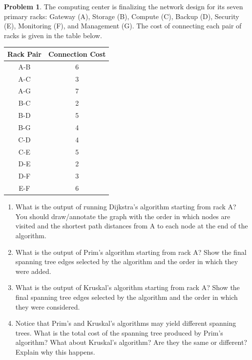 \documentclass[10pt]{article}
\theoremstyle{definition}
\newtheorem{problem}{Problem}
\begin{document}
\begin{problem}
    The computing center is finalizing the network design for its seven primary racks: Gateway (A), Storage (B), Compute (C), Backup (D), Security (E), Monitoring (F), and Management (G). The cost of connecting each pair of racks is given in the table below.
    \begin{center}
        \begin{tabular}{c|c}
            \textbf{Rack Pair} & \textbf{Connection Cost} \\
            \hline
            A-B & 6 \\
            A-C & 3 \\
            A-G & 7 \\
            B-C & 2 \\
            B-D & 5 \\
            B-G & 4 \\
            C-D & 4 \\
            C-E & 5 \\
            D-E & 2 \\
            D-F & 3 \\
            E-F & 6             
        \end{tabular}
    \end{center}

    \begin{enumerate}[label=(\alph*)]
        \item What is the output of running Dijkstra's algorithm starting from rack A? You should draw/annotate the graph with the order in which nodes are visited and the shortest path distances from A to each node at the end of the algorithm.
        \item What is the output of Prim's algorithm starting from rack A? Show the final spanning tree edges selected by the algorithm and the order in which they were added.
        \item What is the output of Kruskal's algorithm starting from rack A? Show the final spanning tree edges selected by the algorithm and the order in which they were considered.
        \item Notice that Prim's and Kruskal's algorithms may yield different spanning trees. What is the total cost of the spanning tree produced by Prim's algorithm? What about Kruskal's algorithm? Are they the same or different? Explain why this happens.
    \end{enumerate}
\end{problem}
\end{document}
